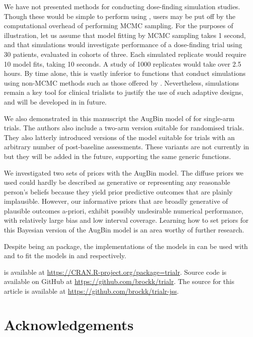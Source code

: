 \documentclass[article]{jss}
\begin{document}
We have not presented methods for conducting dose-finding simulation
studies. Though these would be simple to perform using ,
users may be put off by the computational overhead of performing MCMC
sampling. For the purposes of illustration, let us assume that model
fitting by MCMC sampling takes 1 second, and that simulations would
investigate performance of a dose-finding trial using 30 patients,
evaluated in cohorts of three. Each simulated replicate would require 10
model fits, taking 10 seconds. A study of 1000 replicates would take
over 2.5 hours. By time alone, this is vastly inferior to functions that
conduct simulations using non-MCMC methods such as those offered by
 \citep{dfcrm}. Nevertheless, simulations remain a key tool
for clinical trialists to justify the use of such adaptive designs, and
will be developed in  in future.

We also demonstrated in this manuscript the AugBin model of
\citet{Wason2013} for single-arm trials. The authors also include a
two-arm version suitable for randomised trials. They also latterly
introduced versions of the model suitable for trials with an arbitrary
number of post-baseline assessments. These variants are not currently in
 but they will be added in the future, supporting the same
generic functions.

We investigated two sets of priors with the AugBin model. The diffuse
priors we used could hardly be described as generative or representing
any reasonable person's beliefs because they yield prior predictive
outcomes that are plainly implausible. However, our informative priors
that are broadly generative of plausible outcomes a-priori, exhibit
possibly undesirable numerical performance, with relatively large bias
and low interval coverage. Learning how to set priors for this Bayesian
version of the AugBin model is an area worthy of further research.

Despite being an  package, the 
implementations of the models in  can be used with
 and  to fit the models in 
and  respectively.

 is available at
\url{https://CRAN.R-project.org/package=trialr}. Source code is
available on GitHub at \url{https://github.com/brockk/trialr}. The
source for this article is available at
\url{https://github.com/brockk/trialr-jss}.

\hypertarget{acknowledgements}{%
\section{Acknowledgements}\label{acknowledgements}}
\end{document}
